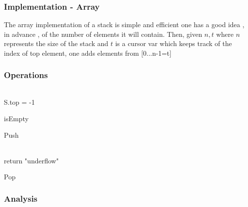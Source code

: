 		\subsubsection{Implementation - Array}

				\par{The array implementation of a stack is simple and efficient  one has a good idea , in advance , of the number of elements it will contain. Then, given $n,t$ where $n$ represents the size of the stack and $t$ is a cursor var which keeps track of the index of top element, one adds elements from [0...n-1=t]}



		\subsubsection{Operations}
			\begin{algorithm}[H]
				\DontPrintSemicolon
				\SetAlgoLined{}
				\\
				\Indp\Return S.top = -1

				\caption{isEmpty}

			\end{algorithm}

			\begin{algorithm}[H]
				\DontPrintSemicolon
				\SetAlgoLined{}
				\caption{Push}

			\end{algorithm}

		\begin{algorithm}[H]
				\DontPrintSemicolon
				\SetAlgoLined{}
				\\
					{return "underflow"}

				\caption{Pop}

			\end{algorithm}

		\subsubsection{Analysis}

